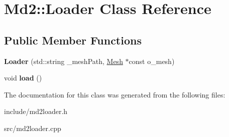\hypertarget{classMd2_1_1Loader}{\section{Md2\-:\-:Loader Class Reference}
\label{classMd2_1_1Loader}
}
\subsection*{Public Member Functions}
\begin{DoxyCompactItemize}
\item 
\hypertarget{classMd2_1_1Loader_a5a6d521c02cf6bc16a1a303d06af00e5}{{\bfseries Loader} (std\-::string \-\_\-mesh\-Path, \hyperlink{classMd2_1_1Mesh}{Mesh} $\ast$const o\-\_\-mesh)}\label{classMd2_1_1Loader_a5a6d521c02cf6bc16a1a303d06af00e5}

\item 
\hypertarget{classMd2_1_1Loader_a77f17fda54e9a637289a3a20e1e623eb}{void {\bfseries load} ()}\label{classMd2_1_1Loader_a77f17fda54e9a637289a3a20e1e623eb}

\end{DoxyCompactItemize}


The documentation for this class was generated from the following files\-:\begin{DoxyCompactItemize}
\item 
include/md2loader.\-h\item 
src/md2loader.\-cpp\end{DoxyCompactItemize}
